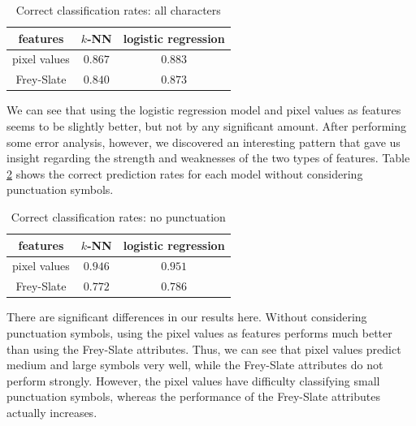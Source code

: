 \documentclass[10pt]{IEEEtran}
\begin{document}
\begin{table}[h]
  \caption{Correct classification rates: all characters}
  \centering
  \begin{tabular}{c|c c}
  \hline
  features & $k$-NN & logistic regression\\
  \hline
  pixel values & $0.867$ & $0.883$ \\
  Frey-Slate & $0.840$ & $0.873$ \\
  \hline
  \end{tabular}
  \label{tab:allChars}
\end{table}

We can see that using the logistic regression model and pixel values as features seems to be slightly better, but not by any significant amount. After performing some error analysis, however, we discovered an interesting pattern that gave us insight regarding the strength and weaknesses of the two types of features. Table \ref{tab:alphanumeric} shows the correct prediction rates for each model without considering punctuation symbols.

\begin{table}[h]
  \caption{Correct classification rates: no punctuation}
  \centering
  \begin{tabular}{c|c c}
  \hline
  features & $k$-NN & logistic regression\\
  \hline
  pixel values & $0.946$ & $0.951$ \\
  Frey-Slate & $0.772$ & $0.786$ \\
  \hline
  \end{tabular}
  \label{tab:alphanumeric}
\end{table}

There are significant differences in our results here. Without considering punctuation symbols, using the pixel values as features performs much better than using the Frey-Slate attributes. Thus, we can see that pixel values predict medium and large symbols very well, while the Frey-Slate attributes do not perform strongly. However, the pixel values have difficulty classifying small punctuation symbols, whereas the performance of the Frey-Slate attributes actually increases.
\end{document}
